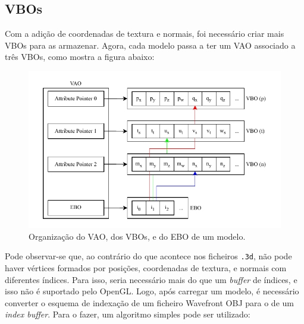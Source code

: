 \documentclass[12pt, a4paper]{article}
\begin{document}
\subsection{VBOs}

Com a adição de coordenadas de textura e normais, foi necessário criar mais VBOs para as armazenar.
Agora, cada modelo passa a ter um VAO associado a três VBOs, como mostra a figura abaixo:

\begin{figure}[H]
    \centering
    \includegraphics[width=\textwidth]{res/phase4/VAO.pdf}
    \caption{Organização do VAO, dos VBOs, e do EBO de um modelo.}
\end{figure}

Pode observar-se que, ao contrário do que acontece nos ficheiros \texttt{.3d}, não pode haver
vértices formados por posições, coordenadas de textura, e normais com diferentes índices. Para isso,
seria necessário mais do que um \emph{buffer} de índices, e isso não é suportado pelo OpenGL. Logo,
após carregar um modelo, é necessário converter o esquema de indexação de um ficheiro Wavefront OBJ
para o de um \emph{index buffer}. Para o fazer, um algoritmo simples pode ser utilizado:
\end{document}
